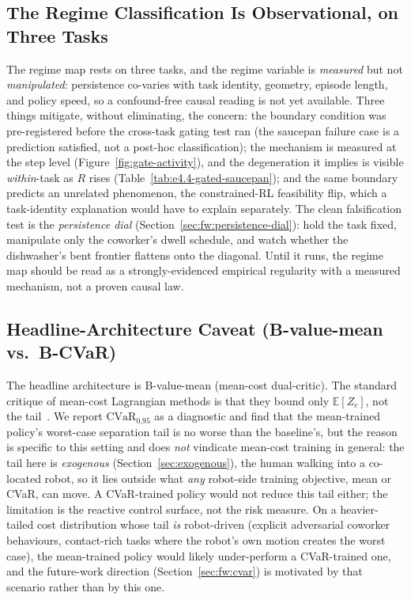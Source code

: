 \documentclass[11pt,a4paper]{report}
\newcommand{\cvar}{\ensuremath{\mathrm{CVaR}}}
\begin{document}
\subsection{The Regime Classification Is Observational, on Three Tasks}
\label{sec:disc:regime-threat}

The regime map rests on three tasks, and the regime variable is
\emph{measured} but not \emph{manipulated}: persistence co-varies
with task identity, geometry, episode length, and policy speed, so a
confound-free causal reading is not yet available. Three things
mitigate, without eliminating, the concern: the boundary condition
was pre-registered before the cross-task gating test ran (the
saucepan failure case is a prediction satisfied, not a post-hoc
classification); the mechanism
is measured at the step level (Figure~\ref{fig:gate-activity}), and
the degeneration it implies is visible \emph{within}-task as $R$
rises (Table~\ref{tab:e4.4-gated-saucepan}); and the same boundary
predicts an unrelated phenomenon, the constrained-RL feasibility
flip, which a task-identity explanation would have to explain
separately. The clean falsification test is the \emph{persistence
dial} (Section~\ref{sec:fw:persistence-dial}): hold the task fixed,
manipulate only the coworker's dwell schedule, and watch whether the
dishwasher's bent frontier flattens onto the diagonal. Until it
runs, the regime map should be read as a strongly-evidenced
empirical regularity with a measured mechanism, not a proven causal
law.

\subsection{Headline-Architecture Caveat (B-value-mean vs.\ B-CVaR)}
\label{sec:disc:arch-caveat}

The headline architecture is B-value-mean (mean-cost dual-critic).
The standard critique of mean-cost Lagrangian methods is that they
bound only $\mathbb{E}[Z_c]$, not the tail~\cite{yang2021wcsac}. We
report $\cvar_{0.95}$ as a diagnostic and find that the mean-trained
policy's worst-case separation tail is no worse than the baseline's,
but the reason is specific to this setting and does \emph{not} vindicate
mean-cost training in general: the tail here is \emph{exogenous}
(Section~\ref{sec:exogenous}), the human walking into a co-located
robot, so it lies outside what \emph{any} robot-side training
objective, mean or CVaR, can move. A CVaR-trained policy would not
reduce this tail either; the limitation is the reactive control
surface, not the risk measure. On a heavier-tailed cost distribution
whose tail \emph{is} robot-driven (explicit adversarial coworker
behaviours, contact-rich tasks where the robot's own motion creates
the worst case), the mean-trained policy would likely under-perform a
CVaR-trained one, and the future-work direction
(Section~\ref{sec:fw:cvar}) is motivated by that scenario rather than
by this one.
\end{document}
